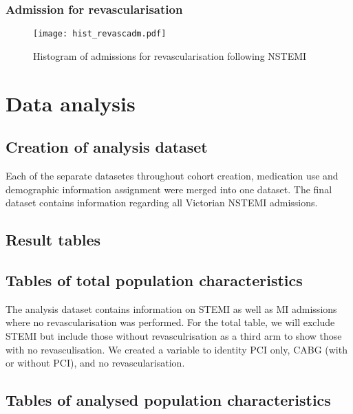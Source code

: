 \documentclass[11pt]{article}
\begin{document}
\subsubsection{Admission for revascularisation}
\color{black}
\begin{stlog}\end{stlog}
\color{black}
\begin{figure} [h]
	\centering
	\texttt{[image: hist\_revascadm.pdf]}
	\caption{Histogram of admissions for revascularisation following NSTEMI}
	\label{hist_revascadm}
\end{figure}

\pagebreak
\section{Data analysis}
\subsection{Creation of analysis dataset}
Each of the separate datasetes throughout cohort creation, medication use and demographic information assignment were merged into one dataset. The final dataset contains information regarding all Victorian NSTEMI admissions.
\color{violet}
\begin{stlog}\end{stlog}
\color{black}
\pagebreak
\subsection{Result tables}
\subsection{Tables of total population characteristics}
The analysis dataset contains information on STEMI as well as MI admissions where no revascularisation was performed. For the total table, we will exclude STEMI but include those without revasculrisation as a third arm to show those with no revasculisation. We created a variable to identity PCI only, CABG (with or without PCI), and no revascularisation. \\ 
\color{violet}
\begin{stlog}\end{stlog}
\color{black}
\pagebreak
\subsection{Tables of analysed population characteristics}
\color{violet}
\begin{stlog}\end{stlog}
\color{black}
\pagebreak
\end{document}
